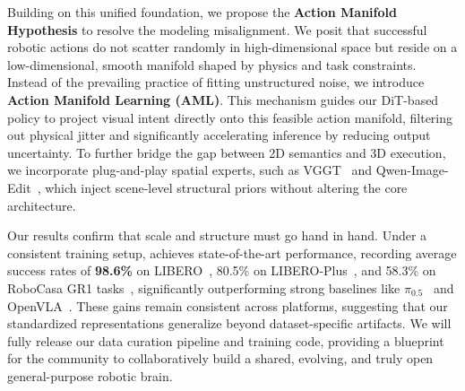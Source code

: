 Building on this unified foundation, we propose the \textbf{Action Manifold Hypothesis} to resolve the modeling misalignment. We posit that successful robotic actions do not scatter randomly in high-dimensional space but reside on a low-dimensional, smooth manifold shaped by physics and task constraints. Instead of the prevailing practice of fitting unstructured noise, we introduce \textbf{Action Manifold Learning (AML)}. This mechanism guides our DiT-based policy to project visual intent directly onto this feasible action manifold, filtering out physical jitter and significantly accelerating inference by reducing output uncertainty. To further bridge the gap between 2D semantics and 3D execution, we incorporate plug-and-play spatial experts, such as VGGT~\cite{wang2025vggt} and Qwen-Image-Edit~\cite{wu2025qwenimagetechnicalreport}, which inject scene-level structural priors without altering the core architecture.

Our results confirm that scale and structure must go hand in hand. Under a consistent training setup, \VLAFM{} achieves state-of-the-art performance, recording average success rates of \textbf{98.6\%} on LIBERO~\cite{liu2023libero}, 80.5\% on LIBERO-Plus~\cite{fei25libero-plus}, and 58.3\% on RoboCasa GR1 tasks~\cite{GR00T}, significantly outperforming strong baselines like $\pi_{0.5}$~\cite{pi_0.5} and OpenVLA~\cite{kim2024openvla}. These gains remain consistent across platforms, suggesting that our standardized representations generalize beyond dataset-specific artifacts. We will fully release our data curation pipeline and training code, providing a blueprint for the community to collaboratively build a shared, evolving, and truly open general-purpose robotic brain.

